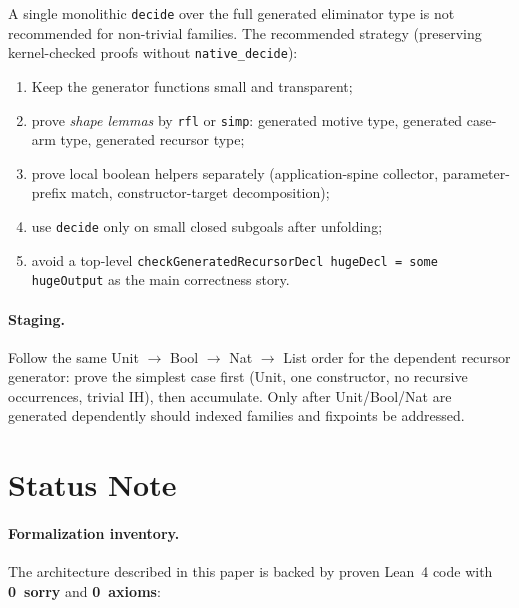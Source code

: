 \documentclass[11pt]{article}
\theoremstyle{remark}
\newcommand{\leanref}[1]{\texttt{#1}}
\begin{document}
A single monolithic \leanref{decide} over the full generated eliminator
type is not recommended for non-trivial families.
The recommended strategy (preserving kernel-checked proofs without
\leanref{native\_decide}):
\begin{enumerate}[nosep]
  \item Keep the generator functions small and transparent;
  \item prove \emph{shape lemmas} by \leanref{rfl} or \leanref{simp}:
    generated motive type, generated case-arm type, generated recursor type;
  \item prove local boolean helpers separately
    (application-spine collector, parameter-prefix match,
    constructor-target decomposition);
  \item use \leanref{decide} only on small closed subgoals after unfolding;
  \item avoid a top-level
    \lstinline|checkGeneratedRecursorDecl hugeDecl = some hugeOutput|
    as the main correctness story.
\end{enumerate}

\paragraph{Staging.}
Follow the same Unit $\to$ Bool $\to$ Nat $\to$ List order for the
dependent recursor generator: prove the simplest case first (Unit, one
constructor, no recursive occurrences, trivial IH), then accumulate.
Only after Unit/Bool/Nat are generated dependently should indexed families
and fixpoints be addressed.

\section{Status Note}

\paragraph{Formalization inventory.}
The architecture described in this paper is backed by proven Lean~4 code
with \textbf{0~sorry} and \textbf{0~axioms}:
\end{document}
